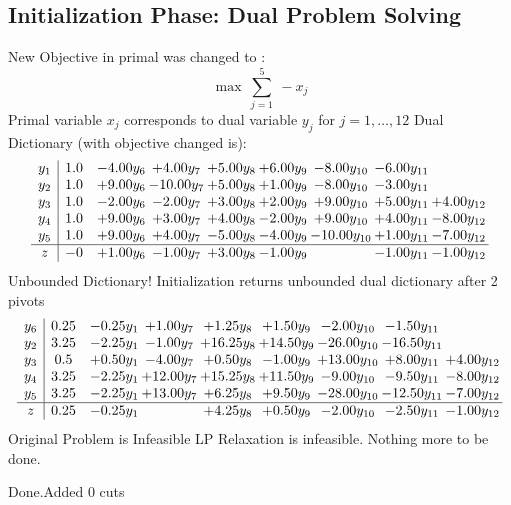 \documentclass[8pt]{article}
\begin{document}
\subsection{Initialization Phase: Dual Problem Solving}
New Objective in primal was changed to : \[ \max\ \sum_{j=1}^{5}\ - x_j \] 
Primal variable $x_j$ corresponds to dual variable $y_j$ for $j = 1,\ldots,12$
Dual Dictionary (with objective changed is): 
\[\begin{array}{c| c c@{\hskip 2pt} c@{\hskip 2pt} c@{\hskip 2pt} c@{\hskip 2pt} c@{\hskip 2pt} c@{\hskip 2pt} c@{\hskip 2pt} }
 y_{1}   &  1.0 & -4.00 y_{6} & +  4.00 y_{7} & +  5.00 y_{8} & +  6.00 y_{9} & -8.00 y_{10} & -6.00 y_{11} &   \\
 y_{2}   &  1.0 & +  9.00 y_{6} & -10.00 y_{7} & +  5.00 y_{8} & +  1.00 y_{9} & -8.00 y_{10} & -3.00 y_{11} &   \\
 y_{3}   &  1.0 & -2.00 y_{6} & -2.00 y_{7} & +  3.00 y_{8} & +  2.00 y_{9} & +  9.00 y_{10} & +  5.00 y_{11} & +  4.00 y_{12}\\
 y_{4}   &  1.0 & +  9.00 y_{6} & +  3.00 y_{7} & +  4.00 y_{8} & -2.00 y_{9} & +  9.00 y_{10} & +  4.00 y_{11} & -8.00 y_{12}\\
 y_{5}   &  1.0 & +  9.00 y_{6} & +  4.00 y_{7} & -5.00 y_{8} & -4.00 y_{9} & -10.00 y_{10} & +  1.00 y_{11} & -7.00 y_{12}\\
\hline
z    &  -0 & +  1.00 y_{6} & -1.00 y_{7} & +  3.00 y_{8} & -1.00 y_{9} &   & -1.00 y_{11} & -1.00 y_{12}\\
\end{array}\]
Unbounded Dictionary!
Initialization returns unbounded dual dictionary after 2 pivots
\[\begin{array}{c| c c@{\hskip 2pt} c@{\hskip 2pt} c@{\hskip 2pt} c@{\hskip 2pt} c@{\hskip 2pt} c@{\hskip 2pt} c@{\hskip 2pt} }
 y_{6}   &  0.25 & -0.25 y_{1} & +  1.00 y_{7} & +  1.25 y_{8} & +  1.50 y_{9} & -2.00 y_{10} & -1.50 y_{11} &   \\
 y_{2}   &  3.25 & -2.25 y_{1} & -1.00 y_{7} & + 16.25 y_{8} & + 14.50 y_{9} & -26.00 y_{10} & -16.50 y_{11} &   \\
 y_{3}   &  0.5 & +  0.50 y_{1} & -4.00 y_{7} & +  0.50 y_{8} & -1.00 y_{9} & + 13.00 y_{10} & +  8.00 y_{11} & +  4.00 y_{12}\\
 y_{4}   &  3.25 & -2.25 y_{1} & + 12.00 y_{7} & + 15.25 y_{8} & + 11.50 y_{9} & -9.00 y_{10} & -9.50 y_{11} & -8.00 y_{12}\\
 y_{5}   &  3.25 & -2.25 y_{1} & + 13.00 y_{7} & +  6.25 y_{8} & +  9.50 y_{9} & -28.00 y_{10} & -12.50 y_{11} & -7.00 y_{12}\\
\hline
z    &  0.25 & -0.25 y_{1} &   & +  4.25 y_{8} & +  0.50 y_{9} & -2.00 y_{10} & -2.50 y_{11} & -1.00 y_{12}\\
\end{array}\]
Original Problem is Infeasible
 LP Relaxation is infeasible. Nothing more to be done. 

Done.Added 0 cuts 
\end{document}
